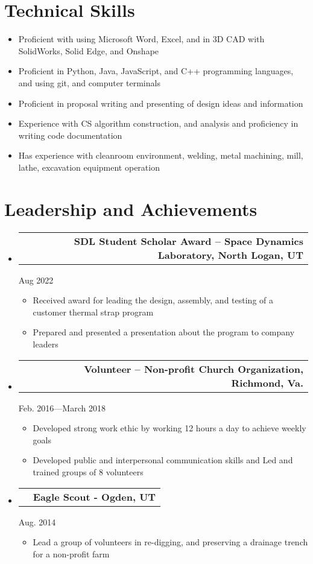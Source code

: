 \documentclass[letterpaper,11pt]{article}
\makeatletter
\newcommand{\resumeProjectHeading}[2]{
    \vspace{-6pt}
    \item
    \begin{tabular*}{1.0\textwidth}{l@{\extracolsep{\fill}}r}
      \small#1 & \textbf{\small #2}\\
    \end{tabular*}\vspace{-11pt}
}
\newcommand{\resumeSubHeadingListStart}{\begin{itemize}[leftmargin=0.0in, label={}]}
\newcommand{\resumeSubHeadingListEnd}{\end{itemize}}
\newcommand{\resumeItemListStart}{\begin{itemize}}
\newcommand{\resumeItemListEnd}{\end{itemize}\vspace{-5pt}}
\newcommand{\resumeItem}[1]{ 
  \item\small{
    {#1 \vspace{-5pt}}
  }
}
\makeatother
\begin{document}
\section{Technical Skills}
    \resumeItemListStart{}
        \resumeItem{Proficient with using Microsoft Word, Excel, and in 3D CAD with SolidWorks, Solid Edge, and Onshape} \vspace{-4.5pt}
        \resumeItem{Proficient in Python, Java, JavaScript, and C++ programming languages, and using git, and computer terminals} \vspace{-4.5pt}
        \resumeItem{Proficient in proposal writing and presenting of design ideas and information} \vspace{-4.5pt}
        \resumeItem{Experience with CS algorithm construction, and analysis and proficiency in writing code documentation} \vspace{-4.5pt}
        \resumeItem{Has experience with cleanroom environment, welding, metal machining, mill, lathe, excavation equipment operation} \vspace{-4.5pt}

    \resumeItemListEnd{}
 
\vspace{-8pt}

\section{Leadership and Achievements }
    \resumeSubHeadingListStart{}
    \resumeProjectHeading{}
      {SDL Student Scholar Award – Space Dynamics Laboratory, North Logan, UT	}{Aug 2022}
      \resumeItemListStart{}
        \resumeItem{Received award for leading the design, assembly, and testing of a customer thermal strap program}
        \resumeItem{Prepared and presented a presentation about the program to company leaders}
      \resumeItemListEnd{}
    \resumeProjectHeading{}
      {Volunteer – Non-profit Church Organization, Richmond, Va.}{Feb. 2016—March 2018}
      \resumeItemListStart{}
        \resumeItem{Developed strong work ethic by working 12 hours a day to achieve weekly goals}
        \resumeItem{Developed public and interpersonal communication skills and Led and trained groups of 8 volunteers}
      \resumeItemListEnd{}
    \resumeProjectHeading{}
      {Eagle Scout - Ogden, UT}{Aug. 2014}
      \resumeItemListStart{}
        \resumeItem{Lead a group of volunteers in re-digging, and preserving a drainage trench for a non-profit farm}
      \resumeItemListEnd{}

    \resumeSubHeadingListEnd{}
\vspace{-16pt}
\end{document}
